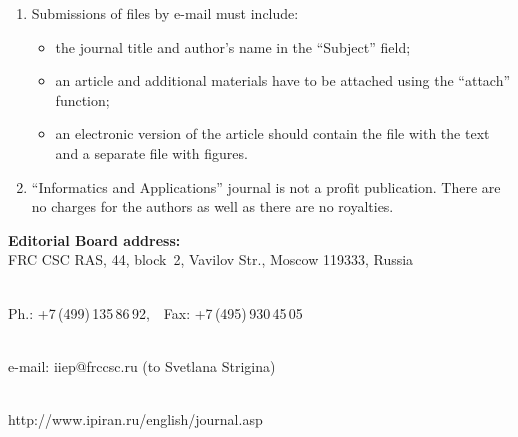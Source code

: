 {\begin{enumerate}[1.]
\item Submissions of files by e-mail must include:\\[-13.5pt]
\begin{itemize}
\item   the journal title and author's name in the ``Subject'' field; \\[-13.5pt]
\item   an article and additional materials have to be attached using the ``attach'' function;\\[-13.5pt]
\item   an electronic version of the article should contain the file with the text and a separate file
with figures.\\[-13.5pt]
\end{itemize}

\item ``Informatics and Applications'' journal is not a profit publication. There are no
charges for the authors as well as there are no royalties.\\[-13.5pt]
\end{enumerate}

\def\leftfootline{\small{\textbf{\thepage}
\hfill INFORMATIKA I EE PRIMENENIYA~--- INFORMATICS AND APPLICATIONS\ \ \ 2022\
\ \ volume~16\ \ \ issue\ 3}
}%
 \def\rightfootline{\small{INFORMATIKA I EE PRIMENENIYA~--- INFORMATICS AND APPLICATIONS\ \ \ 2022\ \ \ volume~16\ \ \ issue\ 3
\hfill \textbf{\thepage}}}

\def\leftkol{Requirements for manuscripts submitted to Journal
``Informatics~and~Applications''}

\def\rightkol{Requirements for manuscripts submitted to Journal
``Informatics~and~Applications''}




\begin{center}
\textbf{Editorial Board address:} \\




FRC CSC RAS, 44, block~2, Vavilov Str., Moscow 119333, Russia\\[-10pt]

\

Ph.: +7\,(499)\,135\,86\,92,\ \ Fax: +7\,(495)\,930\,45\,05\\[-10pt]

\

 e-mail: {\sf iiep@frccsc.ru} (to Svetlana Strigina)\\[-10pt]

\

 {\sf http://www.ipiran.ru/english/journal.asp}
\end{center}
 }

